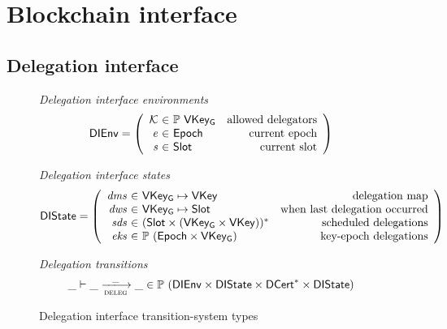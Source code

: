 \section{Blockchain interface}
\label{sec:blockchain-interface}

\newcommand{\DIEnv}{\type{DIEnv}}
\newcommand{\DIState}{\type{DIState}}

\newcommand{\UPIEnv}{\type{UPIEnv}}
\newcommand{\UPIState}{\type{UPIState}}

\subsection{Delegation interface}
\label{sec:delegation-interface}

\begin{figure}[htb]
  \emph{Delegation interface environments}
  \begin{equation*}
    \DIEnv =
    \left(
      \begin{array}{r@{~\in~}lr}
        \mathcal{K} & \powerset{\VKeyGen} & \text{allowed delegators}\\
        \var{e} & \Epoch & \text{current epoch}\\
        \var{s} & \Slot & \text{current slot}
      \end{array}
    \right)
  \end{equation*}

  \emph{Delegation interface states}
  \begin{equation*}
    \DIState
    = \left(
      \begin{array}{r@{~\in~}lr}
        \var{dms} & \VKeyGen \mapsto \VKey & \text{delegation map}\\
        \var{dws} & \VKeyGen \mapsto \Slot & \text{when last delegation occurred}\\
        \var{sds} & \seqof{(\Slot \times (\VKeyGen \times \VKey))} & \text{scheduled delegations}\\
        \var{eks} & \powerset{(\Epoch \times \VKeyGen)} & \text{key-epoch delegations}
      \end{array}
    \right)
  \end{equation*}

  \emph{Delegation transitions}
  \begin{equation*}
    \_ \vdash \_ \trans{deleg}{\_} \_ \in
    \powerset (\DIEnv \times \DIState \times \seqof{\DCert} \times \DIState)
  \end{equation*}
  \caption{Delegation interface transition-system types}
  \label{fig:ts-types:delegation-interface}
\end{figure}

